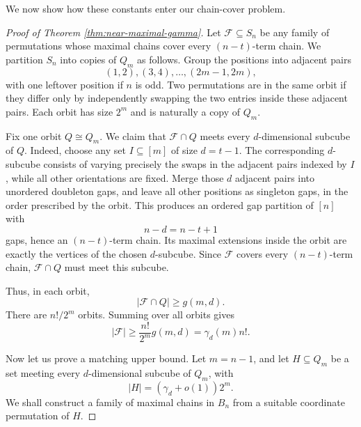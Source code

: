 \documentclass[11pt]{article}
\newtheorem{theorem}{Theorem}[section]
\theoremstyle{definition}
\theoremstyle{remark}
\newcommand{\calF}{\mathcal F}
\begin{document}
We now show how these constants enter our chain-cover problem.


\begin{proof}[Proof of Theorem \ref{thm:near-maximal-gamma}]
Let $\calF\subseteq S_n$ be any family of permutations whose maximal chains cover every $(n-t)$-term chain.  We partition $S_n$ into copies of $Q_m$ as follows.  Group the positions into adjacent pairs
\[
   (1,2),(3,4),\ldots,(2m-1,2m),
\]
with one leftover position if $n$ is odd.  Two permutations are in the same orbit if they differ only by independently swapping the two entries inside these adjacent pairs.  Each orbit has size $2^m$ and is naturally a copy of $Q_m$.

Fix one orbit $Q\cong Q_m$.  We claim that $\calF\cap Q$ meets every $d$-dimensional subcube of $Q$.  Indeed, choose any set $I\subseteq[m]$ of size $d=t-1$.  The corresponding $d$-subcube consists of varying precisely the swaps in the adjacent pairs indexed by $I$, while all other orientations are fixed.  Merge those $d$ adjacent pairs into unordered doubleton gaps, and leave all other positions as singleton gaps, in the order prescribed by the orbit.  This produces an ordered gap partition of $[n]$ with
\[
   n-d=n-t+1
\]
gaps, hence an $(n-t)$-term chain.  Its maximal extensions inside the orbit are exactly the vertices of the chosen $d$-subcube.  Since $\calF$ covers every $(n-t)$-term chain, $\calF\cap Q$ must meet this subcube.

Thus, in each orbit,
\[
   |\calF\cap Q|\ge g(m,d).
\]
There are $n!/2^m$ orbits.  Summing over all orbits gives
\begin{equation}
       |\calF|
   \ge
   \frac{n!}{2^m}g(m,d)
   =\gamma_d(m)n!.
\end{equation}


Now let us prove a matching upper bound.
Let $m=n-1$, and let $H\subseteq Q_m$ be a set meeting every
$d$-dimensional subcube of $Q_m$, with
\[
|H|=(\gamma_d+o(1))2^m.
\]
We shall construct a family of maximal chains in $B_n$ from a suitable
coordinate permutation of $H$.


\end{proof}
\end{document}
